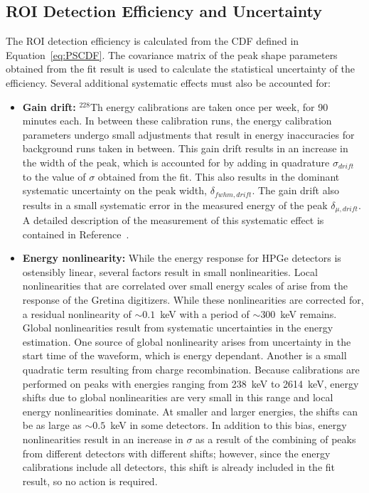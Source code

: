 \documentclass[notitlepage,rmp,aps,10pt]{revtex4-1}
\newcommand{\iso}[2]{$^{#1}$#2}
\newcommand{\Th}[1]{\iso{#1}{Th}}
\begin{document}
\subsection{ROI Detection Efficiency and Uncertainty} \label{sec:ROIEff}
The ROI detection efficiency is calculated from the CDF defined in Equation~\ref{eq:PSCDF}.
The covariance matrix of the peak shape parameters obtained from the fit result is used to calculate the statistical uncertainty of the efficiency.
Several additional systematic effects must also be accounted for:
\begin{itemize}
\item \textbf{Gain drift:} \Th{228} energy calibrations are taken once per week, for 90 minutes each.
  In between these calibration runs, the energy calibration parameters undergo small adjustments that result in energy inaccuracies for background runs taken in between.
  This gain drift results in an increase in the width of the peak, which is accounted for by adding in quadrature $\sigma_{drift}$ to the value of $\sigma$ obtained from the fit.
  This also results in the dominant systematic uncertainty on the peak width, $\delta_{fwhm,drift}$.
  The gain drift also results in a small systematic error in the measured energy of the peak $\delta_{\mu,drift}$.
  A detailed description of the measurement of this systematic effect is contained in Reference~\cite{energysystunidoc}.  
\item \textbf{Energy nonlinearity:} While the energy response for HPGe detectors is ostensibly linear, several factors result in small nonlinearities.
  Local nonlinearities that are correlated over small energy scales of arise from the response of the Gretina digitizers.
  While these nonlinearities are corrected for, a residual nonlinearity of ${\sim}0.1$~keV with a period of ${\sim}300$~keV remains.
  Global nonlinearities result from systematic uncertainties in the energy estimation.
  One source of global nonlinearity arises from uncertainty in the start time of the waveform, which is energy dependant.
  Another is a small quadratic term resulting from charge recombination.
  Because calibrations are performed on peaks with energies ranging from 238~keV to 2614~keV, energy shifts due to global nonlinearities are very small in this range and local energy nonlinearities dominate.
  At smaller and larger energies, the shifts can be as large as ${\sim}0.5$~keV in some detectors.
  In addition to this bias, energy nonlinearities result in an increase in $\sigma$ as a result of the combining of peaks from different detectors with different shifts; however, since the energy calibrations include all detectors, this shift is already included in the fit result, so no action is required.

\end{itemize}
\end{document}
